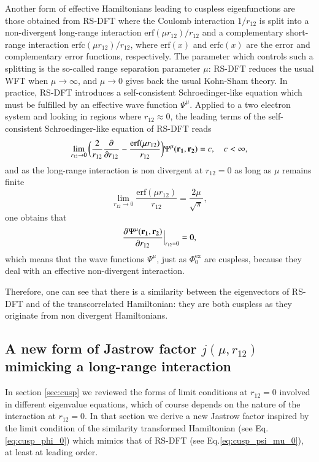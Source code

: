 \documentclass[aip,jcp,reprint,noshowkeys,superscriptaddress]{revtex4-1}
\newcommand{\deriv}[3]{\frac{\partial^{#3} #1}{\partial {#2}^{#3}}}
\newcommand{\bd}[1]{{\bf {#1}}}
\newcommand{\phiex}[0]{\Phi^{\text{ex}}_0}
\begin{document}
Another form of effective Hamiltonians leading to cuspless eigenfunctions are those obtained from RS-DFT 
where the Coulomb interaction $1/r_{12}$ is split into a non-divergent long-range interaction $\text{erf}(\mu r_{12})/r_{12}$ and a complementary short-range interaction $\text{erfc}(\mu r_{12})/r_{12}$, where $\text{erf}(x)$ and $\text{erfc}(x)$ are the error and complementary error functions, respectively. 
The parameter which controls such a splitting is the so-called range separation parameter $\mu$:  RS-DFT reduces the usual WFT when $\mu \rightarrow \infty$, and $\mu \rightarrow 0$ gives back the usual Kohn-Sham theory.  
In practice, RS-DFT introduces a self-consistent Schroedinger-like equation which must be fulfilled by an effective wave function  $\Psi^\mu$.
Applied to a two electron system and looking in regions where $r_{12}\approx 0$, the leading terms of the self-consistent Schroedinger-like equation of RS-DFT reads 
\begin{equation}
 \label{eq:cusp_psi_mu_0}
 \lim_{r_{12}\rightarrow 0}\bigg( \frac{2}{r_{12}} \deriv{}{r_{12}}{} -\frac{\text{erf}(\mu r_{12})}{r_{12}}\bigg) \Psi^\mu(\bd{r_1},\bd{r_2})  = c,\quad c<\infty,  
\end{equation}
and as the long-range interaction is non divergent at $r_{12}=0$ as long as $\mu$ remains finite 
\begin{equation}
 \lim_{r_{12} \rightarrow 0} \frac{\text{erf}(\mu r_{12})}{r_{12}} = \frac{2 \mu}{\sqrt{\pi}} , 
\end{equation}
one obtains that 
\begin{equation}
 \label{eq:cusp_psi_mu_1}
 \deriv{\Psi^\mu(\bd{r_1},\bd{r_2})}{r_{12}}{}\Bigr|_{r_{12}=0} = 0, 
\end{equation}
which means that the wave functions $\Psi^\mu$, just as $\phiex$ are cuspless, because they deal with an effective non-divergent interaction. 

Therefore, one can see that there is a similarity between the eigenvectors of RS-DFT and of the transcorrelated Hamiltonian: they are both cuspless as they originate from non divergent Hamiltonians. 

\subsection{A new form of Jastrow factor $j(\mu,r_{12})$ mimicking a long-range interaction}
In section \ref{sec:cusp} we reviewed the forms of limit conditions at $r_{12}=0$ involved in different eigenvalue equations, which of course depends on the nature of the interaction at $r_{12}=0$. 
In that section we derive a new Jastrow factor inspired by the limit condition of the similarity transformed Hamiltonian (see Eq.\eqref{eq:cusp_phi_0}) which mimics that of RS-DFT (see Eq.\eqref{eq:cusp_psi_mu_0}), at least at leading order. 
\end{document}
